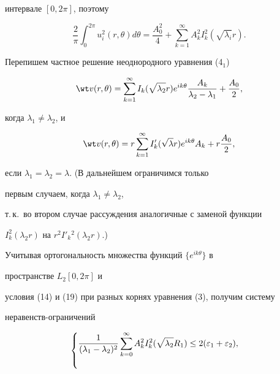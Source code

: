 \begin{pf}
интервале $[0,2\pi]$, поэтому 


$$ 


\frac{2}{\pi}\int^{2\pi}_0u^2_i(r,\theta)d\theta= 


\frac{A^2_0}{4}+\sum^\infty_{k=1}A^2_k I^2_k 


(\sqrt{\lambda_i}r). 


$$ 


Перепишем частное решение неоднородного уравнения (4${}_1$) \cite{8} 


$$ 


\wt v(r,\theta)=\sum^\infty_{k=1}I_k 


(\sqrt{\lambda_2}r)e^{ik\theta} 


\frac{A_k}{\lambda_2-\lambda_1}+\frac{A_0}{2},


$$ 


когда $\lambda_1\ne\lambda_2$, и 


$$ 


\wt v(r,\theta)=r\sum^\infty_{k=1}I'_k 


(\sqrt{\lambda}r)e^{ik\theta}A_k+r\frac{A_0}{2}, 


$$ 


если $\lambda_1=\lambda_2=\lambda$. (В дальнейшем ограничимся только 


первым случаем, когда $\lambda_1\ne\lambda_2$, 


т.\,к.~во втором случае рассуждения аналогичные с заменой функции 


$I^2_k(\lambda_2r)$ на $r^2I'_k{}^2(\lambda_2r)$.) 


 


Учитывая ортогональность множества функций $\{e^{ik\theta}\}$ в 


пространстве $L_2[0,2\pi]$ и 


условия (14) и (19) при разных корнях уравнения (3), получим систему 


неравенств-ограничений 


\begin{equation} 


\begin{cases} 


\displaystyle 


\frac{1}{(\lambda_1-\lambda_2)^2}\sum^\infty_{k=0}A^2_k I^2_k 


(\sqrt{\lambda_2}R_1)\le2(\varepsilon_1+\varepsilon_2),\\ 


\displaystyle 



\end{cases}
\end{equation}
\end{pf}

